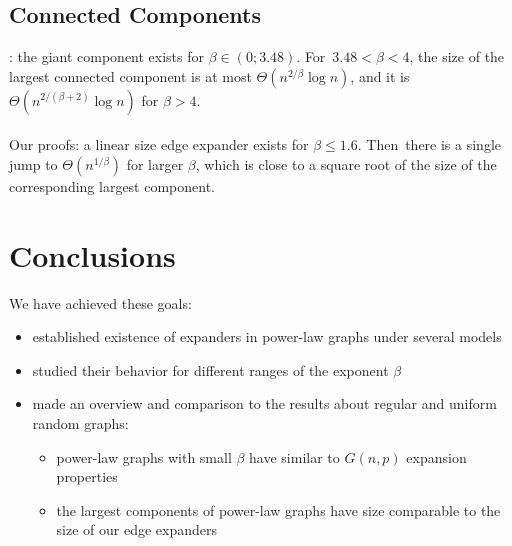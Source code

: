 \documentclass{beamer}
\newcommand{\autotitle}{\secname\ifdefempty{\subsecname}{}{~--- \subsecname}}
\newcommand{\clearsubsecname}{\long\def\subsecname{}}
\begin{document}
\subsection{Connected Components}

\begin{frame}{\autotitle}
    \cite{acl01}: the giant component exists for $\beta\in(0;3.48)$.
    For~$3.48<\beta<4$, the size of the largest connected component is at most
    $\Theta\left(n^{2/\beta}\log n\right)$, and it is
    $\Theta\left(n^{2/(\beta+2)}\log n\right)$ for $\beta>4$.\\~\\
    
    Our proofs: a linear size edge expander exists for $\beta\leq 1.6$.
    Then~there is a single jump to $\Theta\left(n^{1/\beta}\right)$ for larger $\beta$,
    which is close to a square root of the size of the corresponding largest component.
\end{frame}

\section{Conclusions}
\clearsubsecname

\begin{frame}{\autotitle}
    \small
    We have achieved these goals:
    \begin{itemize}
        \item established existence of expanders in power-law graphs under several models
        \item studied their behavior for different ranges of the exponent $\beta$
        \item made an overview and comparison to the results about regular and uniform random graphs:
        \begin{itemize}
            \item power-law graphs with small $\beta$
            have similar to $G(n,p)$ expansion properties
            \item the largest components of power-law graphs have size comparable
            to the size of our edge expanders
        \end{itemize}
    \end{itemize}
\end{frame}
\end{document}
